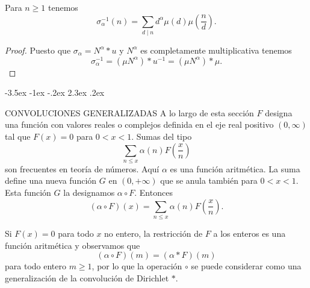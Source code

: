 \documentclass[12pt,a4paper]{book}
\makeatletter
\renewcommand\section{\@startsection{section}{1}{\z@}%
  {-3.5ex \@plus -1ex \@minus -.2ex}%
  {2.3ex \@plus .2ex}%
  {\normalfont\Large\bfseries\raggedright}}
\makeatother
\begin{document}
    \begin{teorema}
        Para $n\geq1$ tenemos
        \begin{equation*}
            \sigma_{\alpha}^{-1}(n)=\sum_{d\mid n}d^{\alpha}\mu(d)\mu\left(\frac{n}{d}\right).
        \end{equation*}
    \end{teorema}

    \begin{proof}
        Puesto que $\sigma_{\alpha}=N^{\alpha}*u$ y $N^{\alpha}$ es completamente multiplicativa
        tenemos
        \begin{equation*}
            \sigma_{\alpha}^{-1}=(\mu N^{\alpha})*u^{-1}=(\mu N^{\alpha})*\mu.
        \end{equation*}
    \end{proof}

    \section{CONVOLUCIONES GENERALIZADAS}\label{sim:gconv}
    A lo largo de esta sección $F$ designa una función con valores reales o complejos
    definida en el eje real positivo $(0,\infty)$ tal que $F(x)=0$ para $0<x<1$. Sumas del
    tipo
    \begin{equation*}
        \sum_{n\leq x}\alpha(n)F\left(\frac{x}{n}\right)
    \end{equation*}
    son frecuentes en teoría de números. Aquí $\alpha$ es una función aritmética. La suma
    define una nueva función $G$ en $(0,+\infty)$ que se anula también para $0<x<1$. Esta
    función $G$ la designamos $\alpha\circ F$. Entonces
    \begin{equation*}
        (\alpha\circ F)(x)=\sum_{n\leq x}\alpha(n)F\left(\frac{x}{n}\right).
    \end{equation*}

    Si $F(x)=0$ para todo $x$ no entero, la restricción de $F$ a los enteros es una función
    aritmética y observamos que
    \begin{equation*}
        (\alpha\circ F)(m)=(\alpha*F)(m)
    \end{equation*}
    para todo entero $m\geq1$, por lo que la operación $\circ$ se puede considerar como una
    generalización de la convolución de Dirichlet $*$.
\end{document}

